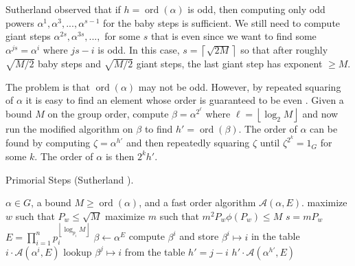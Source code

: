 \documentclass{ucalgthes1}
\theoremstyle{definition}
\DeclareMathOperator{\ord}{ord}
\newcommand{\floor}[1]{\left\lfloor #1 \right\rfloor}
\newcommand{\ceil}[1]{\left\lceil #1 \right\rceil}
\begin{document}
Sutherland observed \cite[p.56]{Sutherland2007} that if $h = \ord(\alpha)$ is odd, then computing only odd powers $\alpha^1, \alpha^3, ..., \alpha^{s-1}$ for the baby steps is sufficient.  We still need to compute giant steps $\alpha^{2s}, \alpha^{3s}, ...,$ for some $s$ that is even since we want to find some $\alpha^{js} = \alpha^i$ where $js - i$ is odd.  In this case, $s = \ceil{\sqrt{2M}}$ so that after roughly $\sqrt{M/2}$ baby steps and $\sqrt{M/2}$ giant steps, the last giant step has exponent $\ge M$.

The problem is that $\ord(\alpha)$ may not be odd.  However, by repeated squaring of $\alpha$ it is easy to find an element whose order is guaranteed to be even \cite[p.56]{Sutherland2007}.  Given a bound $M$ on the group order, compute $\beta = \alpha^{2^\ell}$ where $\ell = \floor{\log_2 M}$ and now run the modified algorithm on $\beta$ to find $h' = \ord(\beta)$.  The order of $\alpha$ can be found by computing $\zeta = \alpha^{h'}$ and then repeatedly squaring $\zeta$ until $\zeta^{2^k} = 1_G$ for some $k$.  The order of $\alpha$ is then $2^k h'$.

\begin{algorithm}[htb]
\caption{Primorial Steps (Sutherland \cite[p.57]{Sutherland2007}).}
\label{alg:primorialSteps}
\begin{algorithmic}[1]
\Require $\alpha \in G$, a bound $M \ge \ord(\alpha)$, and a fast order algorithm $\mathcal A(\alpha, E)$.
\State maximize $w$ such that $P_w \le \sqrt{M}$
\State maximize $m$ such that $m^2P_w\phi(P_w) \le M$
\State $s = mP_w$
\State $E = \prod_{i=1}^n p_i^{\floor{\log_{p_i} M}}$
\State $\beta \gets \alpha^E$
	\State compute $\beta^i$ and store $\beta^i \mapsto i$ in the table 
		\State \Return $i \cdot \mathcal A(\alpha^i, E)$
	\EndIf
\EndFor
{}
		\State lookup $\beta^j \mapsto i$ from the table 
		\State $h' = j - i$
		\State \Return $h' \cdot \mathcal A(\alpha^{h'}, E)$
	\EndIf
\EndFor
\end{algorithmic}
\end{algorithm}
\end{document}
